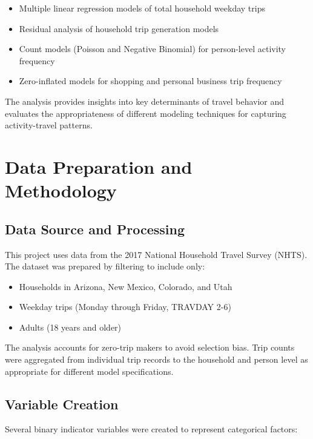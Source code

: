 \documentclass[12pt]{article}
\begin{document}
\begin{itemize}
    \item Multiple linear regression models of total household weekday trips
    \item Residual analysis of household trip generation models 
    \item Count models (Poisson and Negative Binomial) for person-level activity frequency
    \item Zero-inflated models for shopping and personal business trip frequency
\end{itemize}

The analysis provides insights into key determinants of travel behavior and evaluates the appropriateness of different modeling techniques for capturing activity-travel patterns.

\section{Data Preparation and Methodology}

\subsection{Data Source and Processing}

This project uses data from the 2017 National Household Travel Survey (NHTS). The dataset was prepared by filtering to include only:

\begin{itemize}
    \item Households in Arizona, New Mexico, Colorado, and Utah
    \item Weekday trips (Monday through Friday, TRAVDAY 2-6)
    \item Adults (18 years and older)
\end{itemize}

The analysis accounts for zero-trip makers to avoid selection bias. Trip counts were aggregated from individual trip records to the household and person level as appropriate for different model specifications.

\subsection{Variable Creation}

Several binary indicator variables were created to represent categorical factors:
\end{document}
